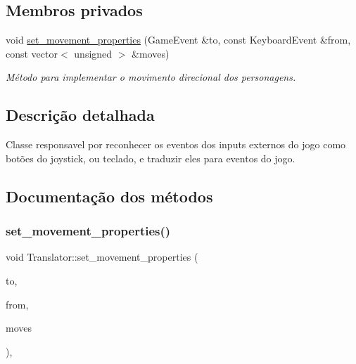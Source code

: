 \subsection*{Membros privados}
\begin{DoxyCompactItemize}
\item 
void \mbox{\hyperlink{classTranslator_ab61b9cc9e645f81a7b73629524c2e69e}{set\+\_\+movement\+\_\+properties}} (Game\+Event \&to, const Keyboard\+Event \&from, const vector$<$ unsigned $>$ \&moves)
\begin{DoxyCompactList}\small\item\em Método para implementar o movimento direcional dos personagens. \end{DoxyCompactList}\end{DoxyCompactItemize}


\subsection{Descrição detalhada}
Classe responsavel por reconhecer os eventos dos inputs externos do jogo como botões do joystick, ou teclado, e traduzir eles para eventos do jogo. 

\subsection{Documentação dos métodos}
\mbox{\label{classTranslator_ab61b9cc9e645f81a7b73629524c2e69e}} 
\subsubsection{\texorpdfstring{set\+\_\+movement\+\_\+properties()}{set\_movement\_properties()}}
{\footnotesize\ttfamily void Translator\+::set\+\_\+movement\+\_\+properties (\begin{DoxyParamCaption}\item[{Game\+Event \&}]{to,  }\item[{const Keyboard\+Event \&}]{from,  }\item[{const vector$<$ unsigned $>$ \&}]{moves }\end{DoxyParamCaption})\hspace{0.3cm}{\ttfamily [inline]}, {\ttfamily [private]}}



